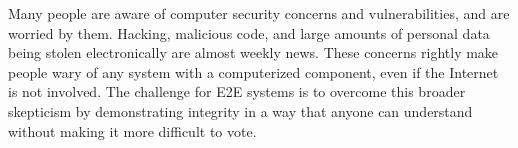 Many people are aware of computer security concerns and
vulnerabilities, and are worried by them. Hacking, malicious code, and
large amounts of personal data being stolen electronically are almost
weekly news. These concerns rightly make people wary of any system
with a computerized component, even if the Internet is not
involved. The challenge for E2E systems is to overcome this broader
skepticism by demonstrating integrity in a way that anyone can
understand without making it more difficult to vote.

